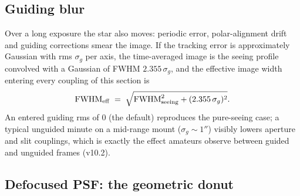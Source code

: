 \subsection{Guiding blur}
\label{sec:guiding}

Over a long exposure the star also moves: periodic error, polar-alignment
drift and guiding corrections smear the image. If the tracking error is
approximately Gaussian with rms $\sigma_g$ per axis, the time-averaged
image is the seeing profile convolved with a Gaussian of FWHM
$2.355\,\sigma_g$, and the effective image width entering every coupling
of this section is
\begin{equation}
  \mathrm{FWHM}_{\rm eff} \;=\;
  \sqrt{\mathrm{FWHM}_{\rm seeing}^2 + (2.355\,\sigma_g)^2}.
\end{equation}
An entered guiding rms of 0 (the default) reproduces the pure-seeing
case; a typical unguided minute on a mid-range mount
($\sigma_g \sim 1''$) visibly lowers aperture and slit couplings, which
is exactly the effect amateurs observe between guided and unguided
frames (v10.2).

\subsection{Defocused PSF: the geometric donut}
\label{sec:defocus}

